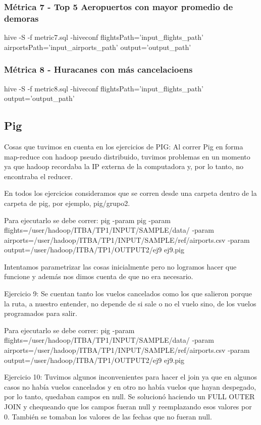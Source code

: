 \documentclass[a4paper,10pt]{article}
\begin{document}
        \subsubsection{Métrica 7 - Top 5 Aeropuertos con mayor promedio de demoras}
        \scriptsize{hive -S -f metric7.sql -hiveconf flightsPath='input\_flights\_path' airportsPath='input\_airports\_path' output='output\_path'}
        \subsubsection{Métrica 8 - Huracanes con más cancelacioens}
        \scriptsize{hive -S -f metric8.sql -hiveconf flightsPath='input\_flights\_path' output='output\_path'}

    \subsection{Pig}
        Cosas que tuvimos en cuenta en los ejercicios de PIG:
Al correr Pig en forma map-reduce con hadoop pseudo distribuido, tuvimos problemas en un momento ya que hadoop recordaba la IP externa de la computadora y, por lo tanto, no encontraba el reducer.

En todos los ejercicios consideramos que se corren desde una carpeta dentro de la carpeta de pig, por ejemplo, pig/grupo2.

Para ejecutarlo se debe correr:
pig -param pig -param flights=/user/hadoop/ITBA/TP1/INPUT/SAMPLE/data/ -param airports=/user/hadoop/ITBA/TP1/INPUT/SAMPLE/ref/airports.csv -param output=/user/hadoop/ITBA/TP1/OUTPUT2/ej9 ej9.pig

Intentamos parametrizar las cosas inicialmente pero no logramos hacer que funcione y además nos dimos cuenta de que no era necesario.

Ejercicio 9: Se cuentan tanto los vuelos cancelados como los que salieron porque la ruta, a nuestro entender, no depende de si sale o no el vuelo sino, de los vuelos programados para salir.

Para ejecutarlo se debe correr:
pig -param flights=/user/hadoop/ITBA/TP1/INPUT/SAMPLE/data/ -param airports=/user/hadoop/ITBA/TP1/INPUT/SAMPLE/ref/airports.csv -param output=/user/hadoop/ITBA/TP1/OUTPUT2/ej9 ej9.pig

Ejercicio 10: Tuvimos algunos inconvenientes para hacer el join ya que en algunos casos no había vuelos cancelados y en otro no había vuelos que hayan despegado, por lo tanto, quedaban campos en null. Se solucionó haciendo un FULL OUTER JOIN y chequeando que los campos fueran null y reemplazando esos valores por 0. También se tomaban los valores de las fechas que no fueran null.
\end{document}
